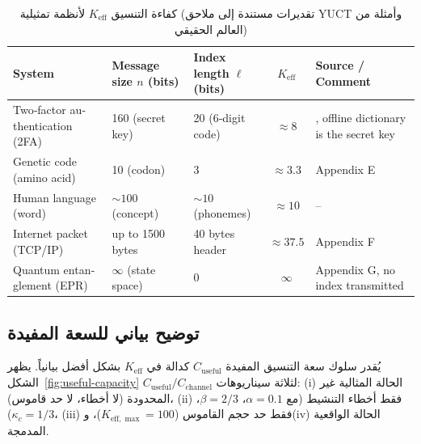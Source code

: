 \documentclass[12pt,a4paper]{article}
\newcommand{\Keff}{K_{\mathrm{eff}}}
\newcommand{\Keffmax}{K_{\mathrm{eff},\max}}
\theoremstyle{remark}
\begin{document}
	\begin{otherlanguage}{english}
		\begin{table}[htbp]
			\centering
			\caption{كفاءة التنسيق \(\Keff\) لأنظمة تمثيلية (تقديرات مستندة إلى ملاحق YUCT وأمثلة من العالم الحقيقي)}
			\label{tab:keff-examples}
			\footnotesize
			\begin{tabularx}{\textwidth}{XXXcX}
				\toprule
				System & Message size $n$ (bits) & Index length $\ell$ (bits) & $\Keff$ & Source / Comment \\
				\midrule
				Two‑factor authentication (2FA) & 160 (secret key) & 20 (6‑digit code) & $\approx 8$ & \cite{Yakushev2026b}, offline dictionary is the secret key \\
				Genetic code (amino acid) & 10 (codon) & 3 & $\approx 3.3$ & Appendix E \\
				Human language (word) & $\sim 100$ (concept) & $\sim 10$ (phonemes) & $\approx 10$ & – \\
				Internet packet (TCP/IP) & up to 1500 bytes & 40 bytes header & $\approx 37.5$ & Appendix F \\
				Quantum entanglement (EPR) & $\infty$ (state space) & 0 & $\infty$ & Appendix G, no index transmitted \\
				\bottomrule
			\end{tabularx}
		\end{table}
	\end{otherlanguage}
	
	\subsection{توضيح بياني للسعة المفيدة}
	\label{sec:graphical}
	
	يُقدر سلوك سعة التنسيق المفيدة \(C_{\text{useful}}\) كدالة في \(\Keff\) بشكل أفضل بيانياً. يظهر الشكل~\ref{fig:useful-capacity} \(C_{\text{useful}}/C_{\text{channel}}\) لثلاثة سيناريوهات: (i) الحالة المثالية غير المحدودة (لا أخطاء، لا حد قاموس)، (ii) فقط أخطاء التنشيط (مع \(\alpha=0.1\)، \(\beta=2/3\)، \(\kappa_c=1/3\))، (iii) فقط حد حجم القاموس (\(\Keffmax=100\))، و(iv) الحالة الواقعية المدمجة.
	
\end{document}
